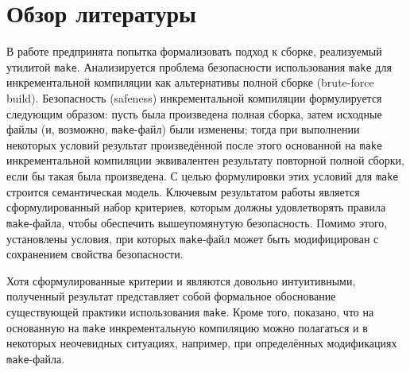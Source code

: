 \section{Обзор литературы}

В работе \cite{safeness_niels} предпринята попытка формализовать подход к сборке, реализуемый утилитой \texttt{make}. Анализируется проблема безопасности использования \texttt{make} для инкрементальной компиляции как альтернативы полной сборке (brute-force build). Безопасность (safeness) инкрементальной компиляции формулируется следующим образом: пусть была произведена полная сборка, затем исходные файлы (и, возможно, \texttt{make}-файл) были изменены; тогда при выполнении некоторых условий результат произведённой после этого основанной на \texttt{make} инкрементальной компиляции эквивалентен результату повторной полной сборки, если бы такая была произведена. С целью формулировки этих условий для \texttt{make} строится семантическая модель. Ключевым результатом работы является сформулированный набор критериев, которым должны удовлетворять правила \texttt{make}-файла, чтобы обеспечить вышеупомянутую безопасность. Помимо этого, установлены условия, при которых \texttt{make}-файл может быть модифицирован с сохранением свойства безопасности.

Хотя сформулированные критерии и являются довольно интуитивными, полученный результат представляет собой формальное обоснование существующей практики использования \texttt{make}. Кроме того, показано, что на основанную на \texttt{make} инкрементальную компиляцию можно полагаться и в некоторых неочевидных ситуациях, например, при определённых модификациях \texttt{make}-файла.\\

